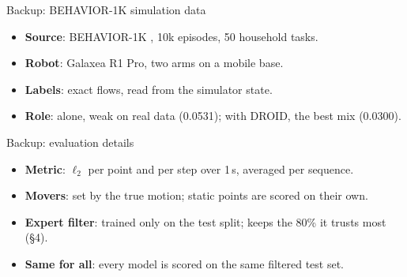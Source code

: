 \documentclass[aspectratio=169,12pt]{beamer}
\newcommand{\src}[1]{{\scriptsize\color{mute}\citep{#1}}}
\newcommand{\pw}[1]{{\color{pw}#1}}
\newenvironment{notes}[1][\linewidth]
  {\begin{minipage}{#1}\footnotesize\begin{itemize}\setlength{\itemsep}{2pt}}
  {\end{itemize}\end{minipage}}
\begin{document}
\begin{frame}[label=bk-b1k]{Backup: BEHAVIOR-1K simulation data}
  \centering
  \vfill
  \begin{notes}[\linewidth]
    \item \textbf{Source}: BEHAVIOR-1K \src{li2024behavior}, 10k episodes, 50 household tasks.
    \item \textbf{Robot}: Galaxea R1 Pro, two arms on a mobile base.
    \item \textbf{Labels}: exact flows, read from the simulator state.
    \item \textbf{Role}: \pw{alone, weak on real data (0.0531); with DROID, the best mix (0.0300).}
  \end{notes}
  \vspace{8pt}
  \vfill
\end{frame}

\begin{frame}[label=bk-eval]{Backup: evaluation details}
  \vfill
  \footnotesize
  \begin{itemize}\setlength{\itemsep}{14pt}
    \item \textbf{Metric}: $\ell_2$ per point and per step over 1\,s, averaged per sequence.
    \item \textbf{Movers}: set by the true motion; static points are scored on their own.
    \item \textbf{Expert filter}: trained only on the test split; keeps the 80\% it trusts
      most (\S4).
    \item \textbf{Same for all}: \pw{every model is scored on the same filtered test set.}
  \end{itemize}
  \vspace{10pt}
  \vfill
\end{frame}
\end{document}
